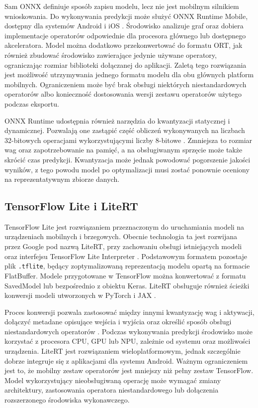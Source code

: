 Sam ONNX definiuje sposób zapisu modelu, lecz nie jest mobilnym silnikiem wnioskowania. Do wykonywania predykcji może służyć ONNX Runtime Mobile, dostępny dla systemów Android i iOS \cite{onnxRuntimeMobile2026}. Środowisko analizuje graf oraz dobiera implementacje operatorów odpowiednie dla procesora głównego lub dostępnego akceleratora. Model można dodatkowo przekonwertować do formatu ORT, jak również zbudować środowisko zawierające jedynie używane operatory, ograniczając rozmiar biblioteki dołączanej do aplikacji. Zaletą tego rozwiązania jest możliwość utrzymywania jednego formatu modelu dla obu głównych platform mobilnych. Ograniczeniem może być brak obsługi niektórych niestandardowych operatorów albo konieczność dostosowania wersji zestawu operatorów użytego podczas eksportu.

ONNX Runtime udostępnia również narzędzia do kwantyzacji statycznej i dynamicznej. Pozwalają one zastąpić część obliczeń wykonywanych na liczbach 32-bitowych operacjami wykorzystującymi liczby 8-bitowe \cite{onnxQuantization2026}. Zmniejsza to rozmiar wag oraz zapotrzebowanie na pamięć, a na obsługiwanym sprzęcie może także skrócić czas predykcji. Kwantyzacja może jednak powodować pogorszenie jakości wyników, z tego powodu model po optymalizacji musi zostać ponownie oceniony na reprezentatywnym zbiorze danych.

\subsection{TensorFlow Lite i LiteRT}

TensorFlow Lite jest rozwiązaniem przeznaczonym do uruchamiania modeli na urządzeniach mobilnych i brzegowych. Obecnie technologia ta jest rozwijana przez Google pod nazwą LiteRT, przy zachowaniu obsługi istniejących modeli oraz interfejsu TensorFlow Lite Interpreter \cite{liteRTMigration2026}. Podstawowym formatem pozostaje plik \texttt{.tflite}, będący zoptymalizowaną reprezentacją modelu opartą na formacie FlatBuffer. Modele przygotowane w TensorFlow można konwertować z formatu SavedModel lub bezpośrednio z obiektu Keras. LiteRT obsługuje również ścieżki konwersji modeli utworzonych w PyTorch i JAX \cite{liteRTOverview2026}.

Proces konwersji pozwala zastosować między innymi kwantyzację wag i aktywacji, dołączyć metadane opisujące wejścia i wyjścia oraz określić sposób obsługi niestandardowych operatorów \cite{liteRTConversion2026}. Podczas wykonywania predykcji środowisko może korzystać z procesora CPU, GPU lub NPU, zależnie od systemu oraz możliwości urządzenia. LiteRT jest rozwiązaniem wieloplatformowym, jednak szczególnie dobrze integruje się z aplikacjami dla systemu Android. Ważnym ograniczeniem jest to, że mobilny zestaw operatorów jest mniejszy niż pełny zestaw TensorFlow. Model wykorzystujący nieobsługiwaną operację może wymagać zmiany architektury, zastosowania operatora niestandardowego lub dołączenia rozszerzonego środowiska wykonawczego.

